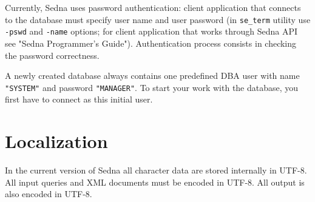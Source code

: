 \documentclass[a4paper,12pt]{article}
\begin{document}
Currently, Sedna uses password authentication: client application that connects to the database must specify user name and user password (in \verb!se_term! utility use \verb!-pswd! and \verb!-name! options; for client application that works through Sedna API see "Sedna Programmer's Guide"). Authentication process consists in checking the password correctness.

A newly created database always contains one predefined DBA user with name \verb!"SYSTEM"! and password \verb!"MANAGER"!. To start your work with the database, you first have to connect as this initial user.

\section{Localization}
In the current version of Sedna all character data are stored internally in UTF-8.
All input queries and XML documents must be encoded in UTF-8.
All output is also encoded in UTF-8.
\end{document}
